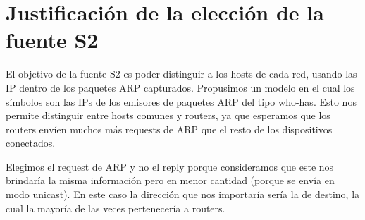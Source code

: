 \section{Justificación de la elección de la fuente S2}

El objetivo de la fuente S2 es poder distinguir a los hosts de cada red, usando las IP dentro de los paquetes ARP capturados. Propusimos un modelo en el cual los símbolos son las IPs de los emisores de paquetes ARP del tipo who-has. Esto nos permite distinguir entre hosts comunes y routers, ya que esperamos que los routers envíen muchos más requests de ARP que el resto de los dispositivos conectados.

Elegimos el request de ARP y no el reply porque consideramos que este nos brindaría la misma información pero en menor cantidad (porque se envía en modo unicast). En este caso la dirección que nos importaría sería la de destino, la cual la mayoría de las veces pertenecería a routers.

